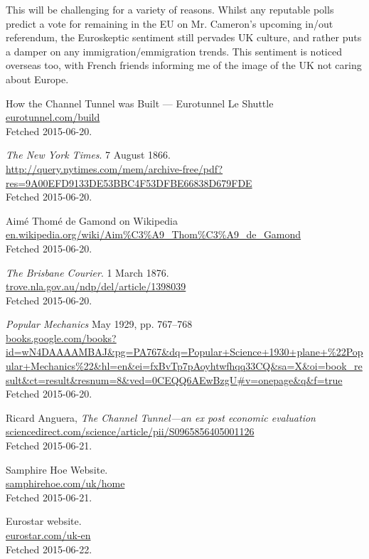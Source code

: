 \documentclass[12pt]{article} %
\begin{document}
This will be challenging for a variety of reasons. Whilst any reputable polls predict a vote for remaining in the EU on Mr. Cameron's upcoming in\slash out referendum, the Euroskeptic sentiment still pervades UK culture, and rather puts a damper on any immigration\slash emmigration trends. This sentiment is noticed overseas too, with French friends informing me of the image of the UK not caring about Europe.

\begin{thebibliography}{99}

	How the Channel Tunnel was Built --- Eurotunnel Le Shuttle\\
	\url{eurotunnel.com/build}\\
	Fetched 2015-06-20.

	\textit{The New York Times}. 7 August 1866.\\
	\url{http://query.nytimes.com/mem/archive-free/pdf?res=9A00EFD9133DE53BBC4F53DFBE66838D679FDE}\\
	Fetched 2015-06-20.

	Aimé Thomé de Gamond on Wikipedia\\
	\url{en.wikipedia.org/wiki/Aim%C3%A9_Thom%C3%A9_de_Gamond}\\
	Fetched 2015-06-20.

	\textit{The Brisbane Courier}. 1 March 1876.\\
	\url{trove.nla.gov.au/ndp/del/article/1398039}\\
	Fetched 2015-06-20.

	\emph{Popular Mechanics} May 1929, pp. 767--768\\
	\url{books.google.com/books?id=wN4DAAAAMBAJ&pg=PA767&dq=Popular+Science+1930+plane+%22Popular+Mechanics%22&hl=en&ei=fxBvTp7pAoyhtwfhqq33CQ&sa=X&oi=book_result&ct=result&resnum=8&ved=0CEQQ6AEwBzgU#v=onepage&q&f=true}\\
	Fetched 2015-06-20.

	Ricard Anguera, \textit{The Channel Tunnel---an ex post economic evaluation}\\
	\url{sciencedirect.com/science/article/pii/S0965856405001126}\\
	Fetched 2015-06-21.

	Samphire Hoe Website.\\
	\url{samphirehoe.com/uk/home}\\
	Fetched 2015-06-21.

	Eurostar website.\\
	\url{eurostar.com/uk-en}\\
	Fetched 2015-06-22.
	

\end{thebibliography}
\end{document}
